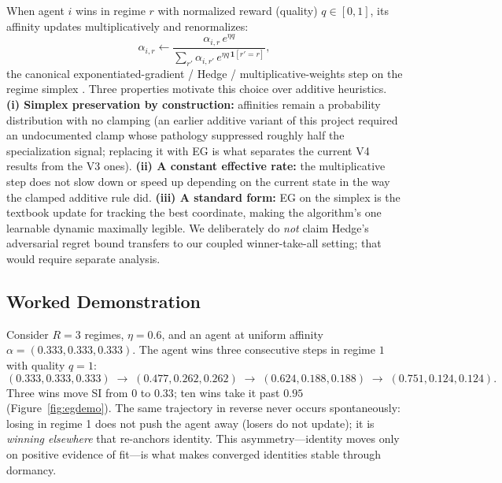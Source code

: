 \documentclass[10pt]{article}
\begin{document}
When agent $i$ wins in regime $r$ with normalized reward (quality) $q \in [0,1]$,
its affinity updates multiplicatively and renormalizes:
\begin{equation}
    \alpha_{i,r} \leftarrow \frac{\alpha_{i,r}\, e^{\eta q}}
    {\sum_{r'} \alpha_{i,r'}\, e^{\eta q\,\mathbf{1}[r'=r]}},
\end{equation}
the canonical exponentiated-gradient / Hedge / multiplicative-weights step on
the regime simplex \cite{kivinen1997exponentiated, freund1997decision,
arora2012multiplicative, cesa2006prediction}. Three properties motivate this
choice over additive
heuristics. \textbf{(i) Simplex preservation by construction:} affinities remain
a probability distribution with no clamping (an earlier additive variant of this
project required an undocumented clamp whose pathology suppressed roughly half
the specialization signal; replacing it with EG is what separates the current
V4 results from the V3 ones). \textbf{(ii) A constant effective rate:} the
multiplicative step does not slow down or speed up depending on the current
state in the way the clamped additive rule did. \textbf{(iii) A standard form:}
EG on the simplex is the textbook update for tracking the best coordinate,
making the algorithm's one learnable dynamic maximally legible. We deliberately
do \emph{not} claim Hedge's adversarial regret bound transfers to our coupled
winner-take-all setting; that would require separate analysis.

\subsection{Worked Demonstration}

Consider $R=3$ regimes, $\eta = 0.6$, and an agent at uniform affinity
$\alpha = (0.333, 0.333, 0.333)$. The agent wins three consecutive steps in
regime $1$ with quality $q = 1$:
\[
(0.333,0.333,0.333) \;\to\; (0.477,0.262,0.262) \;\to\; (0.624,0.188,0.188)
\;\to\; (0.751,0.124,0.124).
\]
Three wins move SI from $0$ to $0.33$; ten wins take it past $0.95$
(Figure~\ref{fig:egdemo}). The same
trajectory in reverse never occurs spontaneously: losing in regime 1 does not
push the agent away (losers do not update); it is \emph{winning elsewhere} that
re-anchors identity. This asymmetry---identity moves only on positive evidence
of fit---is what makes converged identities stable through dormancy.
\end{document}
